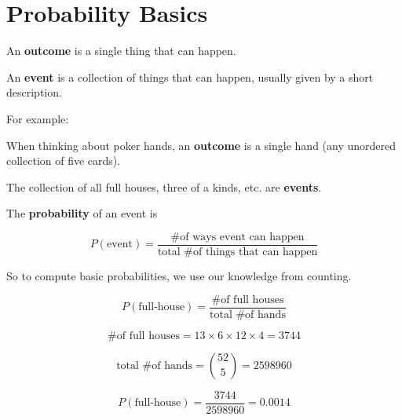 \section{Probability Basics}

%
\begin{frame}

An \textbf{outcome} is a single thing that can happen.

\hfill

An \textbf{event} is a collection of things that can happen, usually given by a
short description.

\end{frame}
%

%
\begin{frame}

For example:

\hfill

When thinking about poker hands, an \textbf{outcome} is a single hand (any
unordered collection of five cards).

\hfill

The collection of all full houses, three of a kinds, etc. are \textbf{events}.

\end{frame}


%
\begin{frame}

The \textbf{probability} of an event is

$$ P(\text{event}) = \frac{\text{\# of ways event can happen}}{\text{total \# of
things that can happen}} $$

So to compute basic probabilities, we use our knowledge from counting.

\end{frame}
%

%
\begin{frame}

$$ P(\text{full-house}) = \frac{\text{\# of full houses}}{\text{total \# of
hands}} $$

\end{frame}
%

%
\begin{frame}

$$ \text{\# of full houses} = 13 \times 6 \times 12 \times 4 = 3744 $$

$$ \text{total \# of hands} = {{52}\choose{5}} = 2598960 $$

\end{frame}
%

%
\begin{frame}

$$ P(\text{full-house}) = \frac{3744}{2598960} = 0.0014 $$

\end{frame}
%

